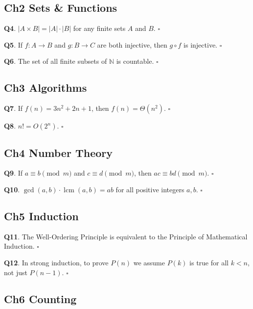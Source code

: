 \documentclass[11pt,a4paper,fontset=mac]{ctexart}
\newcommand{\tfblank}{$\square$}
\newcommand{\question}[1]{\textbf{Q#1}.}
\begin{document}
\subsection*{Ch2\;\; Sets \& Functions}

\question{4}  $|A\times B| = |A|\cdot|B|$ for any finite sets $A$ and $B$.
\hfill\tfblank

\question{5}  If $f:A\to B$ and $g:B\to C$ are both injective, then
$g\circ f$ is injective.
\hfill\tfblank

\question{6}  The set of all finite subsets of $\mathbb{N}$ is countable.
\hfill\tfblank

\subsection*{Ch3\;\; Algorithms}

\question{7}  If $f(n)=3n^{2}+2n+1$, then $f(n)=\Theta(n^{2})$.
\hfill\tfblank

\question{8}  $n! = O(2^{n})$.
\hfill\tfblank

\subsection*{Ch4\;\; Number Theory}

\question{9}  If $a\equiv b\pmod m$ and $c\equiv d\pmod m$, then
$ac\equiv bd\pmod m$.
\hfill\tfblank

\question{10}  $\gcd(a,b)\cdot\operatorname{lcm}(a,b)=ab$ for all positive
integers $a,b$.
\hfill\tfblank

\subsection*{Ch5\;\; Induction}

\question{11}  The Well-Ordering Principle is equivalent to the Principle
of Mathematical Induction.
\hfill\tfblank

\question{12}  In strong induction, to prove $P(n)$ we assume $P(k)$ is
true for all $k<n$, not just $P(n-1)$.
\hfill\tfblank

\subsection*{Ch6\;\; Counting}
\end{document}
